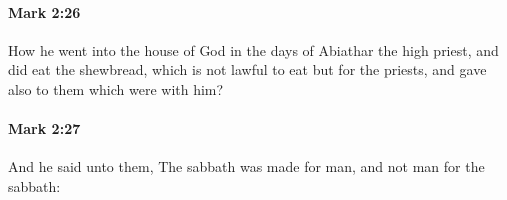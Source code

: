		\paragraph{Mark 2:26} %
			\label{MARK-2-26}

			How he went into the house of God in the days of Abiathar the high priest, and did eat the shewbread, which is not lawful to eat but for the priests, and gave also to them which were with him?

			\begin{framed}
			\scriptsize
				\begin{compactdesc}
					\item[SBLG] 
				\end{compactdesc}
			\end{framed}

		\paragraph{Mark 2:27} %
			\label{MARK-2-27}

			And he said unto them, The sabbath was made for man, and not man for the sabbath:

